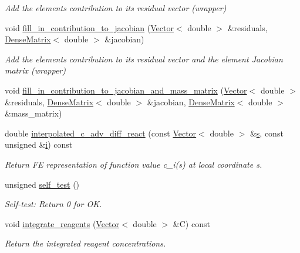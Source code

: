 \begin{DoxyCompactItemize}
\begin{DoxyCompactList}\small\item\em Add the element\textquotesingle{}s contribution to its residual vector (wrapper) \end{DoxyCompactList}\item 
void \hyperlink{classoomph_1_1AdvectionDiffusionReactionEquations_a32feca5a89aee13169544e2eb0af975a}{fill\+\_\+in\+\_\+contribution\+\_\+to\+\_\+jacobian} (\hyperlink{classoomph_1_1Vector}{Vector}$<$ double $>$ \&residuals, \hyperlink{classoomph_1_1DenseMatrix}{Dense\+Matrix}$<$ double $>$ \&jacobian)
\begin{DoxyCompactList}\small\item\em Add the element\textquotesingle{}s contribution to its residual vector and the element Jacobian matrix (wrapper) \end{DoxyCompactList}\item 
void \hyperlink{classoomph_1_1AdvectionDiffusionReactionEquations_ae316c9cbe79a215744dc52bd19fb1a27}{fill\+\_\+in\+\_\+contribution\+\_\+to\+\_\+jacobian\+\_\+and\+\_\+mass\+\_\+matrix} (\hyperlink{classoomph_1_1Vector}{Vector}$<$ double $>$ \&residuals, \hyperlink{classoomph_1_1DenseMatrix}{Dense\+Matrix}$<$ double $>$ \&jacobian, \hyperlink{classoomph_1_1DenseMatrix}{Dense\+Matrix}$<$ double $>$ \&mass\+\_\+matrix)
\item 
double \hyperlink{classoomph_1_1AdvectionDiffusionReactionEquations_a9346b9c6e14ebc68149dc2a571416112}{interpolated\+\_\+c\+\_\+adv\+\_\+diff\+\_\+react} (const \hyperlink{classoomph_1_1Vector}{Vector}$<$ double $>$ \&\hyperlink{cfortran_8h_ab7123126e4885ef647dd9c6e3807a21c}{s}, const unsigned \&\hyperlink{cfortran_8h_adb50e893b86b3e55e751a42eab3cba82}{i}) const
\begin{DoxyCompactList}\small\item\em Return FE representation of function value c\+\_\+i(s) at local coordinate s. \end{DoxyCompactList}\item 
unsigned \hyperlink{classoomph_1_1AdvectionDiffusionReactionEquations_a30b954f7ec758cf93a4b477a8652c9e2}{self\+\_\+test} ()
\begin{DoxyCompactList}\small\item\em Self-\/test\+: Return 0 for OK. \end{DoxyCompactList}\item 
void \hyperlink{classoomph_1_1AdvectionDiffusionReactionEquations_a75c644617090bfec77366b455bb5e91a}{integrate\+\_\+reagents} (\hyperlink{classoomph_1_1Vector}{Vector}$<$ double $>$ \&C) const
\begin{DoxyCompactList}\small\item\em Return the integrated reagent concentrations. \end{DoxyCompactList}\end{DoxyCompactItemize}
